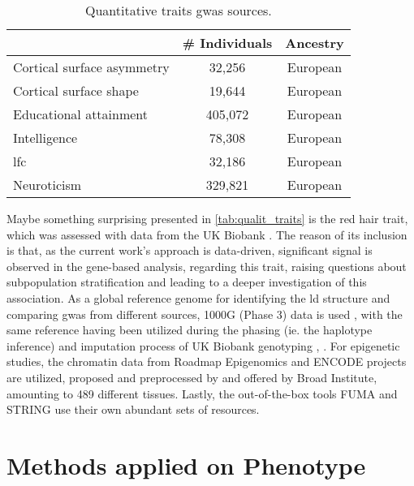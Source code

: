 \begin{table} [H]
	\centering
	\begin{tabular}{lcc}\toprule
		& \# Individuals & Ancestry\\\midrule
		Cortical surface asymmetry\cite{Sha2021} & 32,256 & European\\
		Cortical surface shape\cite{Naqvi2021} & 19,644 & European \\
		Educational attainment\cite{Okbay2016} &  405,072 & European \\
		Intelligence\cite{Sniekers2017} & 78,308 & European \\
		\acs{lfc}\cite{Mekki2022} & 32,186 & European \\
		Neuroticism\cite{Luciano2018} & 329,821 & European \\
		\bottomrule
	\end{tabular}
	\caption{Quantitative traits \ac{gwas} sources.}
	\label{tab:quantit_traits}
\end{table}
Maybe something surprising presented in \autoref{tab:qualit_traits} is the red hair trait, which was assessed with data from the UK Biobank \cite{Morgan2018}. The reason of its inclusion is that, as the current work's approach is data-driven, significant signal is observed in the gene-based analysis, regarding this trait, raising questions about subpopulation stratification and leading to a deeper investigation of this association. 
As a global reference genome for identifying the \ac{ld} structure and comparing \ac{gwas} from different sources, 1000G (Phase 3) data is used \cite{Auton2015}, with the same reference having been utilized during the phasing (ie. the haplotype inference) and imputation process of UK Biobank genotyping \cite{Bycroft2018}, . For epigenetic studies, the chromatin data from Roadmap Epigenomics \cite{RoadmapEpigenomicsConsortium2015} and ENCODE \cite{Dunham2012} projects are utilized, proposed and preprocessed by \citet{Finucane2018} and offered by Broad Institute, amounting to 489 different tissues. Lastly, the out-of-the-box tools FUMA \cite{Watanabe2017} and STRING\cite{Szklarczyk2021} use their own abundant sets of resources.




\section{Methods applied on Phenotype}
\label{sec:methods_on_pheno}
